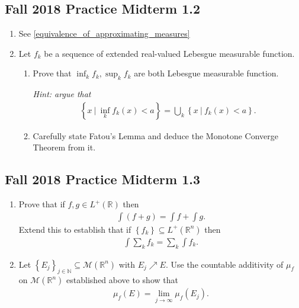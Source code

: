 \hypertarget{fall-2018-practice-midterm-1.2}{%
\subsection{Fall 2018 Practice Midterm
1.2}\label{fall-2018-practice-midterm-1.2}}

\begin{enumerate}
\def\labelenumi{\alph{enumi}.}
\item
  See \cref{equivalence_of_approximating_measures}
\item
  Let \(f_k\) be a sequence of extended real-valued Lebesgue measurable
  function.

  \begin{enumerate}
  \def\labelenumii{\roman{enumii}.}
  \item
    Prove that \(\inf_k f_k, \sup_k f_k\) are both Lebesgue measurable
    function.

    \emph{Hint: argue that}
    \begin{align*}
    \left\{{x {~\mathrel{\Big\vert}~}\inf_k f_k(x) < a}\right\} = \displaystyle\bigcup_k \left\{{x {~\mathrel{\Big\vert}~}f_k(x) < a}\right\}
    .\end{align*}
  \item
    Carefully state Fatou's Lemma and deduce the Monotone Converge
    Theorem from it.
  \end{enumerate}
\end{enumerate}

\hypertarget{fall-2018-practice-midterm-1.3}{%
\subsection{Fall 2018 Practice Midterm
1.3}\label{fall-2018-practice-midterm-1.3}}

\begin{enumerate}
\def\labelenumi{\alph{enumi}.}
\item
  Prove that if \(f, g\in L^+({\mathbb{R}})\) then
  \begin{align*}
  \int(f +g) = \int f + \int g
  .\end{align*}
  Extend this to establish that if
  \(\left\{{ f_k}\right\} \subseteq L^+({\mathbb{R}}^n)\) then
  \begin{align*}
    \int \sum_k f_k = \sum_k \int f_k
    .\end{align*}
\item
  Let
  \(\left\{{E_j}\right\}_{j\in {\mathbb{N}}} \subseteq \mathcal{M}({\mathbb{R}}^n)\)
  with \(E_j \nearrow E\). Use the countable additivity of \(\mu_f\) on
  \(\mathcal{M}({\mathbb{R}}^n)\) established above to show that
  \begin{align*}
    \mu_f(E) = \lim_{j\to \infty } \mu_f(E_j)
    .\end{align*}
\end{enumerate}

